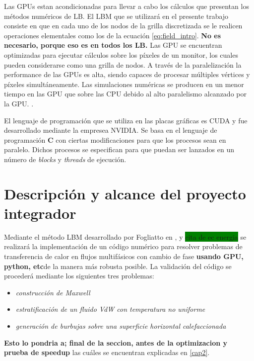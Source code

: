 Las GPUs estan acondicionadas para llevar a cabo los cálculos que presentan los métodos numéricos de LB. El LBM que se utilizará en el presente trabajo consiste en que en cada uno de los nodos de la grilla discretizada se le realicen operaciones elementales como los de la ecuación \ref{eq:field_intro}. \textbf{No es necesario, porque eso es en todos los LB.} Las GPU se encuentran optimizadas para ejecutar cálculos sobre los píxeles de un monitor, los cuales pueden considerarse como una grilla de nodos. A través de la paralelización la performance de las GPUs es alta, siendo capaces de procesar múltiples vértices y píxeles simultáneamente. Las simulaciones numéricas se producen en un menor tiempo en las GPU que sobre las CPU debido al alto paralelismo alcanzado por la GPU. \cite{rinaldi2011modelos}.

El lenguaje de programación que se utiliza en las placas gráficas es CUDA y fue desarrollado mediante la empresea NVIDIA. Se basa en el lenguaje de programación \textbf{C} con ciertas modificaciones para que los procesos sean en paralelo. Dichos procesos se especifican para que puedan ser lanzados en un número de \textit{blocks} y \textit{threads} de ejecución.






\section{Descripción y alcance del proyecto integrador}

Mediante el método LBM desarrollado por Fogliatto en \cite{fogliatto2018modelado}, \cite{fogliatto2019simulation} y \colorbox{green}{cita de ec energia} se realizará la implementación de un código numérico para resolver problemas de transferencia de calor en flujos multifásicos con cambio de fase \textbf{usando GPU, python, etc}de la manera más robusta posible. 
La validación del código se procederá mediante los siguientes tres problemas:
\begin{itemize}
	\item \textit{construcción de Maxwell}
	\item \textit{estratificación de un fluido VdW con temperatura no uniforme}
	\item \textit{generación de burbujas sobre una superficie horizontal calefaccionada}
\end{itemize} 

\textbf{Esto lo pondria a; final de la seccion, antes de la optimizacion y prueba de speedup}
las cuáles se encuentran explicadas en \ref{cap2}.

